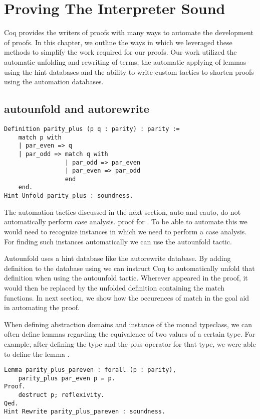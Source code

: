 \chapter{Proving The Interpreter Sound}
Coq provides the writers of proofs with many ways to automate the development
of proofs. In this chapter, we outline the ways in which we leveraged these
methods to simplify the work required for our proofs. Our work utilized the
automatic unfolding and rewriting of terms, the automatic applying of lemmas
using the hint databases and the ability to write custom tactics to shorten 
proofs using the automation databases.

\section{autounfold and autorewrite}

\begin{verbatim}
Definition parity_plus (p q : parity) : parity :=
    match p with
    | par_even => q
    | par_odd => match q with
                 | par_odd => par_even
                 | par_even => par_odd
                 end
    end.
Hint Unfold parity_plus : soundness.
\end{verbatim}

The automation tactics discussed in the next section, auto and
eauto, do not automatically perform case analysis.
proof for . To be able to automate this we would need
to recognize instances in which we need to perform a case analysis. For finding
such instances automatically we can use the autounfold tactic.

Autounfold uses a hint database like the autorewrite database. By adding
definition to the database using  we can instruct Coq to
automatically unfold that definition when using the autounfold tactic. Wherever
 appeared in the proof, it would then be replaced by the
unfolded definition containing the match functions. In next section,
we show how the occurences of match in the goal aid in automating the proof.

When defining abstraction domains and instance of the monad typeclass, we can
often define lemmas regarding the equivalence of two values of a certain type.
For example, after defining the  type and the plus operator
for that type, we were able to define the lemma .

\begin{verbatim}
Lemma parity_plus_pareven : forall (p : parity),
    parity_plus par_even p = p.
Proof. 
    destruct p; reflexivity.
Qed.
Hint Rewrite parity_plus_pareven : soundness.
\end{verbatim}


